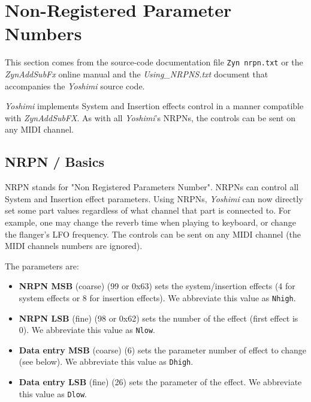 %
%
%

\section{Non-Registered Parameter Numbers}
\label{sec:nrpns}

   This section comes from the source-code documentation file
   \texttt{Zyn nrpn.txt} or the \textsl{ZynAddSubFx}
   online manual \cite{zyndoc} and the \textsl{Using\_NRPNS.txt} document that
   accompanies the \textsl{Yoshimi} source code.

   \textsl{Yoshimi} implements System and Insertion effects control in a
   manner compatible with \textsl{ZynAddSubFX}. As with all
   \textsl{Yoshimi}'s NRPNs, the controls can be sent on any MIDI channel.

\subsection{NRPN / Basics}
\label{subsection:nrpns_midi_nrpn_basics}

   NRPN stands for "Non Registered Parameters Number".
   NRPNs can control all System and Insertion effect parameters.
   Using NRPNs, \textsl{Yoshimi} can now directly set some part values
   regardless of what channel that part is connected to.  For example, one
   may change the reverb time when playing to keyboard, or
   change the flanger's LFO frequency.
   The controls can be sent on any MIDI channel 
   (the MIDI channels numbers are ignored).

   The parameters are:

   \begin{itemize}
      \item \textbf{NRPN MSB}
      (coarse) (99 or 0x63) sets the system/insertion effects
      (4 for system effects or 8 for insertion effects).
      We abbreviate this value as \texttt{Nhigh}.
      \item \textbf{NRPN LSB}
      (fine) (98 or 0x62) sets the number of the effect (first
      effect is 0).
      We abbreviate this value as \texttt{Nlow}.
      \item \textbf{Data entry MSB}
      (coarse) (6) sets the parameter number of effect to
      change (see below).
      We abbreviate this value as \texttt{Dhigh}.
      \item \textbf{Data entry LSB}
      (fine) (26) sets the parameter of the effect.
      We abbreviate this value as \texttt{Dlow}.
   \end{itemize}

